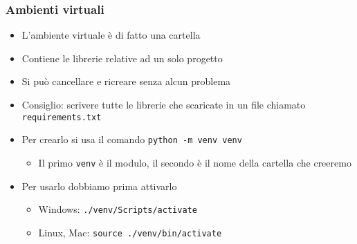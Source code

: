 \begin{contentframe}
    \frametitle{Ambienti virtuali}

    \begin{itemize}
        \item L'ambiente virtuale è di fatto una cartella
        \item Contiene le librerie relative ad un solo progetto
        \item Si può cancellare e ricreare senza alcun problema

        \item Consiglio: scrivere tutte le librerie che scaricate in un file chiamato \texttt{requirements.txt}

        \bigskip
        \item Per crearlo si usa il comando \texttt{python -m venv venv}
        \begin{itemize}
            \item Il primo \texttt{venv} è il modulo, il secondo è il nome della cartella che creeremo
        \end{itemize}
        \item Per usarlo dobbiamo prima attivarlo
        \begin{itemize}
            \item Windows: \texttt{./venv/Scripts/activate}
            \item Linux, Mac: \texttt{source ./venv/bin/activate}
        \end{itemize}
    \end{itemize}
\end{contentframe}

